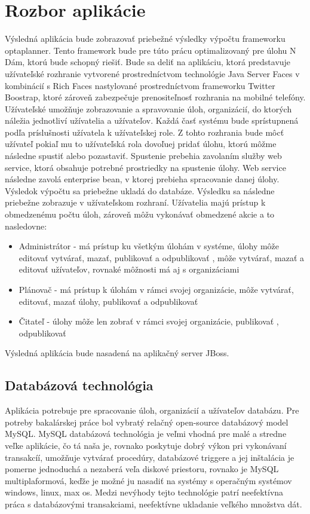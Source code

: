 \section{Rozbor aplikácie}
Výsledná aplikácia bude zobrazovať priebežné výsledky výpočtu frameworku optaplanner. Tento framework bude pre túto prácu optimalizovaný pre úlohu N Dám, ktorú bude schopný riešiť. Bude sa deliť na aplikáciu, ktorá predstavuje užívateľské rozhranie vytvorené prostredníctvom technológie Java Server Faces v kombinácií s Rich Faces nastylované prostredníctvom frameworku Twitter Boostrap, ktoré zároveň zabezpečuje prenositeľnosť rozhrania na mobilné telefóny. Užívateľské umožňuje zobrazovanie a spravovanie úloh, organizácií, do ktorých náležia jednotliví užívatelia a užívateľov. Každá časť systému bude sprístupnená podľa príslušnosti užívatela k užívateľskej role. Z tohto rozhrania bude môcť užívateľ pokiaľ mu to užívateľská rola dovoľuej pridať úlohu, ktorú môžme následne spustiť alebo pozastaviť. Spustenie prebehia zavolaním služby web service, ktorá obsahuje potrebné prostriedky na spustenie úlohy. Web service následne zavolá enterprise bean, v ktorej prebieha spracovanie danej úlohy. Výsledok výpočtu sa priebežne ukladá do databáze. Výsledku sa následne priebežne zobrazuje v užívateľskom rozhraní. Užívatelia majú prístup k obmedzenému počtu úloh, zároveň môžu vykonávať obmedzené akcie a to nasledovne:
\begin{itemize}
\item Administrátor - má prístup ku všetkým úlohám v systéme, úlohy môže editovať vytvárať, mazať, publikovať a odpublikovať , môže vytvárať, mazať a editovať užívateľov, rovnaké môžnosti má aj s organizáciami
\item Plánovač - má prístup k úlohám v rámci svojej organizácie, môže vytvárať, editovať, mazať úlohy, publikovať a odpublikovať
\item Čitateľ - úlohy môže len zobrať v rámci svojej organizácie, publikovať , odpublikovať
\end{itemize}


Výsledná aplikácia bude nasadená na aplikačný server JBoss.

\subsection{Databázová technológia}
Aplikácia potrebuje pre spracovanie úloh, organizácií a užívateľov databázu. Pre potreby bakalárskej práce bol vybratý relačný open-source databázový model MySQL. MySQL databázová technológia je veľmi vhodná pre malé a stredne veľke aplikácie, čo tá naša je, rovnako poskytuje dobrý výkon pri vykonávaní transakcíí, umožňuje vytvárať procedúry, databázové triggere a jej inštalácia je pomerne jednoduchá a nezaberá veľa diskové priestoru, rovnako je MySQL multiplaformová, keďže je možné ju nasadiť na systémy s operačným systémov windows, linux, max os. Medzi nevýhody tejto technológie patrí neefektívna práca s databázovými transakciami, neefektívne ukladanie veľkého množstva dát.

